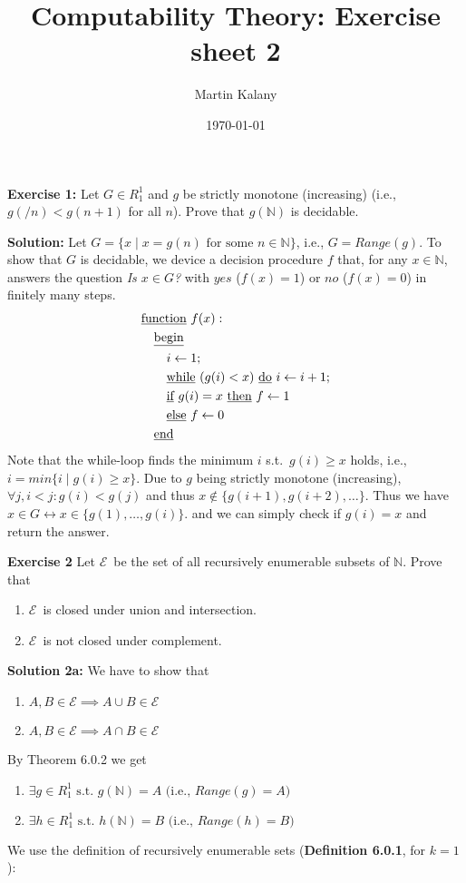 \documentclass [11pt]{article}
\title{Computability Theory: Exercise sheet 2}
\author{Martin Kalany}
\date{\today}
\newcommand{\E}{\ensuremath{\mathcal{E}}}
\newcommand{\N}{\ensuremath{\mathbb{N}}}
\newcommand{\lra}{\ensuremath{\leftrightarrow}}
\begin{document}
\maketitle

\bigskip
\noindent
\textbf{Exercise 1:} Let $G \in R^1_1$ and $g$ be strictly monotone (increasing) (i.e., $g(/n) < g(n+1)$ for all $n$). Prove that $g(\N)$ is decidable.

\noindent
\textbf{Solution:} Let $G = \{x \mid x = g(n) \text{ for some } n\in \N\}$, i.e., $G = Range(g)$.
To show that $G$ is decidable, we device a decision procedure $f$ that, for any $x\in \N$, answers the question \emph{Is $x \in G$?} with $yes$ ($f(x) = 1$) or $no$ ($f(x) = 0$) in finitely many steps.
\begin{align*}
& \text{\underline{function} } f(x): \\
& \quad \text{\underline{begin}} \\
& \quad \quad i \leftarrow 1; \\
& \quad \quad \text{\underline{while} } (g(i) < x) \text{ \underline{do} } i \leftarrow i +1; \\
& \quad \quad \text{\underline{if} } g(i) = x \text{ \underline{then} } f \leftarrow 1\\
& \quad \quad \text{\underline{else} } f \leftarrow 0\\
& \quad \text{\underline{end}}
\end{align*}
Note that the while-loop finds the minimum $i$ s.t.\ $g(i) \geq x$ holds, i.e., $i= min\{i \mid g(i) \geq x\}$. 
Due to $g$ being strictly monotone (increasing), $\forall j, i < j: g(i) < g(j)$ and thus $x\not \in \{g(i+1), g(i+2),\dots\}$.
Thus we have $x\in G \lra x \in \{g(1),\dots,g(i)\}$. and we can simply check if $g(i) = x$ and return the answer.

\bigskip
\noindent
\textbf{Exercise 2}  Let \E\ be the set of all recursively enumerable subsets of \N. Prove that 
\begin{enumerate}[label={\alph*)}] 
 \item \E\ is closed under union and intersection.
 \item \E\ is not closed under complement.
\end{enumerate}
\textbf{Solution 2a:}
We have to show that
\begin{enumerate}[label={\alph*)}] 
 \item $A, B \in \E \implies A\cup B \in \E$ 
 \item $A, B \in \E \implies A\cap B \in \E$ 
\end{enumerate}
By Theorem 6.0.2 we get 
\begin{enumerate}[label={\alph*)}] 
 \item $\exists g \in R_1^1 \text{ s.t.\ } g(\N) = A \text{ (i.e., } Range(g) = A)$
 \item $\exists h \in R_1^1 \text{ s.t.\ } h(\N) = B\text{ (i.e., } Range(h) = B)$
\end{enumerate}
We use the definition of recursively enumerable sets (\textbf{Definition 6.0.1}, for $k=1$):
\end{document}

